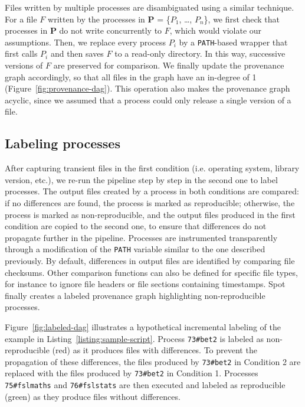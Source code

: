 \documentclass[a4paper,num-refs]{oup-contemporary}
\newcommand{\toolname}[0]{Spot\xspace}
\begin{document}
Files written by multiple processes are disambiguated using a similar technique. For a
 file $F$ written by the processes in \textbf{P} = \{$P_{1}$, \ldots,
 $P_{n}$\}, we first check that processes in \textbf{P} do not
 write concurrently to $F$, which would violate our assumptions. Then, we
 replace every process $P_{i}$ by a \texttt{PATH}-based wrapper that first
 calls $P_{i}$ and then saves $F$ to a read-only directory. In this way,
 successive versions of $F$ are preserved for comparison. We finally
 update the provenance graph accordingly, so that all files in the graph
 have an in-degree of 1 (Figure~\ref{fig:provenance-dag}). This operation also makes the provenance graph
 acyclic, since we assumed that a process could only release a single version of a file.

\subsection{Labeling processes} 

After capturing transient files in the first condition (i.e. operating system, library version, etc.),
we re-run the pipeline
step by step in the second one to label processes. The output files
created by a process in both conditions are compared: if no differences are found, the process is marked as
reproducible; otherwise, the process is marked as non-reproducible, and the
output files produced in the first condition are copied to the second one, to ensure
that differences do not propagate further in the pipeline. Processes are
instrumented transparently through a modification of the \texttt{PATH}
variable similar to the one described previously. By default, differences
in output files are identified by comparing file checksums. Other
comparison functions can also be defined for specific file types, for
instance to ignore file headers or file sections containing timestamps.
\toolname finally creates a labeled
provenance graph highlighting non-reproducible processes.

Figure~\ref{fig:labeled-dag} illustrates a hypothetical incremental
labeling of the example in Listing~\ref{listing:sample-script}. Process
\texttt{73\#bet2} is labeled as non-reproducible (red) as it produces files
with differences. To prevent the propagation of these differences, the
files produced by \texttt{73\#bet2} in Condition 2 are replaced with the
files produced by \texttt{73\#bet2} in Condition 1. Processes
\texttt{75\#fslmaths} and \texttt{76\#fslstats} are then executed and
labeled as reproducible (green) as they produce files without differences.
\end{document}
